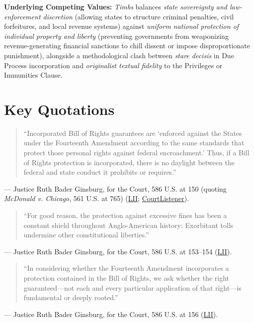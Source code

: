 \documentclass[12pt]{article}
\begin{document}
\textbf{Underlying Competing Values:} \textit{Timbs} balances \textit{state sovereignty and law-enforcement discretion} (allowing states to structure criminal penalties, civil forfeitures, and local revenue systems) against \textit{uniform national protection of individual property and liberty} (preventing governments from weaponizing revenue-generating financial sanctions to chill dissent or impose disproportionate punishment), alongside a methodological clash between \textit{stare decisis} in Due Process incorporation and \textit{originalist textual fidelity} to the Privileges or Immunities Clause.

\section{Key Quotations}

\begin{quote}
``Incorporated Bill of Rights guarantees are `enforced against the States under the Fourteenth Amendment according to the same standards that protect those personal rights against federal encroachment.' Thus, if a Bill of Rights protection is incorporated, there is no daylight between the federal and state conduct it prohibits or requires.''
\end{quote}
\noindent --- Justice Ruth Bader Ginsburg, for the Court, 586 U.S. at 150 (quoting \textit{McDonald v. Chicago}, 561 U.S. at 765) (\href{https://www.law.cornell.edu/supremecourt/text/17-1091}{LII}; \href{https://www.courtlistener.com/opinion/4591916/timbs-v-indiana/}{CourtListener}).

\begin{quote}
``For good reason, the protection against excessive fines has been a constant shield throughout Anglo-American history: Exorbitant tolls undermine other constitutional liberties.''
\end{quote}
\noindent --- Justice Ruth Bader Ginsburg, for the Court, 586 U.S. at 153--154 (\href{https://www.law.cornell.edu/supremecourt/text/17-1091}{LII}).

\begin{quote}
``In considering whether the Fourteenth Amendment incorporates a protection contained in the Bill of Rights, we ask whether the right guaranteed---not each and every particular application of that right---is fundamental or deeply rooted.''
\end{quote}
\noindent --- Justice Ruth Bader Ginsburg, for the Court, 586 U.S. at 156 (\href{https://www.law.cornell.edu/supremecourt/text/17-1091}{LII}).
\end{document}
